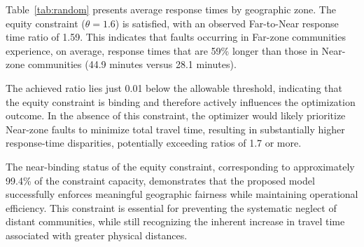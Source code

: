 \documentclass[11pt]{article}
\begin{document}
Table~\ref{tab:random} presents average response times by geographic zone. The equity constraint ($\theta = 1.6$) is satisfied, with an observed Far-to-Near response time ratio of 1.59. This indicates that faults occurring in Far-zone communities experience, on average, response times that are 59\% longer than those in Near-zone communities (44.9 minutes versus 28.1 minutes).

The achieved ratio lies just 0.01 below the allowable threshold, indicating that the equity constraint is binding and therefore actively influences the optimization outcome. In the absence of this constraint, the optimizer would likely prioritize Near-zone faults to minimize total travel time, resulting in substantially higher response-time disparities, potentially exceeding ratios of 1.7 or more.

The near-binding status of the equity constraint, corresponding to approximately 99.4\% of the constraint capacity, demonstrates that the proposed model successfully enforces meaningful geographic fairness while maintaining operational efficiency. This constraint is essential for preventing the systematic neglect of distant communities, while still recognizing the inherent increase in travel time associated with greater physical distances.
\end{document}
